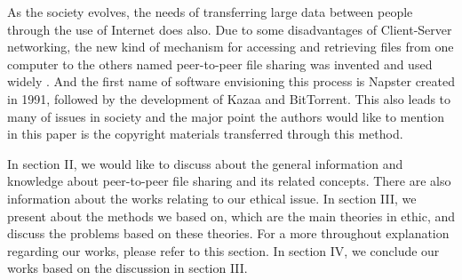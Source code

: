 \documentclass[conference]{IEEEtran}
\begin{document}
As the society evolves, the needs of transferring large data between people through the use of Internet does also.  Due to some disadvantages of Client-Server networking, the new kind of mechanism for accessing and retrieving files from one computer to the others named peer-to-peer file sharing was invented and used widely \cite{clientserver}. And the first name of software envisioning this process is Napster created in 1991, followed by the development of Kazaa and BitTorrent. This also leads to many of issues in society and the major point the authors would like to mention in this paper is the copyright materials transferred through this method. 

In section II, we would like to discuss about the general information and knowledge about peer-to-peer file sharing and its related concepts. There are also information about the works relating to our ethical issue. In section III, we present about the methods we based on, which are the main theories in ethic, and discuss the problems based on these theories. For a more throughout explanation regarding our works, please refer to this section. In section IV, we conclude our works based on the discussion in section III.








%
%
\end{document}
